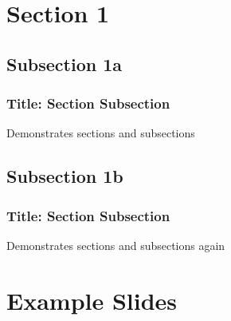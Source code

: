 



\section{Section 1}\label{Sec1}





\subsection{Subsection 1a}\label{Sub1a}



\begin{frame}\frametitle{Title: Section \thesection Subsection \thesubsection}
Demonstrates sections and subsections
\end{frame}

\subsection{Subsection 1b}

\begin{frame}\frametitle{Title: Section \thesection Subsection \thesubsection}
  Demonstrates sections and subsections again
\end{frame}

\section{Example Slides}



